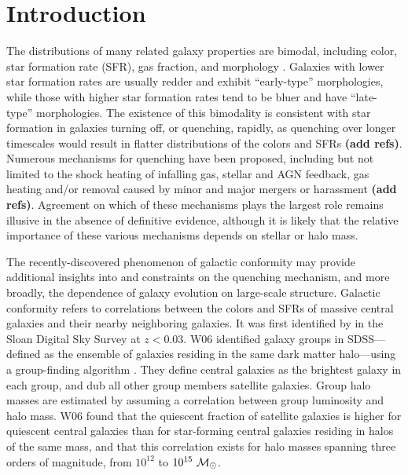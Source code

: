
\section{Introduction}\label{sec:intro}


The distributions of many related galaxy properties are bimodal, including color, star formation rate (SFR), gas fraction, and morphology
\citep{Strateva01, Kauffmann03, Baldry04, Balogh04a, Balogh04b}.
Galaxies with lower star formation rates are usually redder and exhibit ``early-type'' morphologies, while those with higher star formation rates tend to be bluer and have ``late-type'' morphologies.
The existence of this bimodality is consistent with star formation in galaxies turning off, or quenching, rapidly, as quenching over longer timescales would result in flatter distributions of the colors and SFRs {\bf(add refs)}.
Numerous mechanisms for quenching have been proposed, including but not limited to the shock heating of infalling gas, stellar and AGN feedback, gas heating and/or removal caused by minor and major mergers or harassment {\bf(add refs)}.
Agreement on which of these mechanisms plays the largest role remains illusive in the absence of definitive evidence, although it is likely that the relative importance of these various mechanisms depends on stellar or halo mass.

The recently-discovered phenomenon of galactic conformity may provide additional insights into and constraints on the quenching mechanism, and more broadly, the dependence of galaxy evolution on large-scale structure.
Galactic conformity refers to correlations between the colors and SFRs of massive central galaxies and their nearby neighboring galaxies.
It was first identified by \citet[][hereafter W06]{Weinmann06} in the Sloan Digital Sky Survey \citep[SDSS;][]{York00} at $z<0.03$.
W06 identified galaxy groups in SDSS---defined as the ensemble of galaxies residing in the same dark matter halo---using a group-finding algorithm \citep{Yang05a}.
They define central galaxies as the brightest galaxy in each group, and dub all other group members satellite galaxies.
Group halo masses are estimated by assuming a correlation between group luminosity and halo mass.
W06 found that the quiescent fraction of satellite galaxies is higher for quiescent central galaxies than for star-forming central galaxies residing in halos of the same mass, and that this correlation exists for halo masses spanning three orders of magnitude, from $10^{12}$ to $10^{15}~\msun$.

